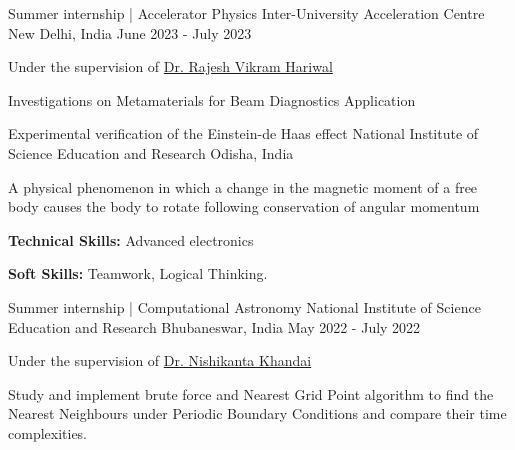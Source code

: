 

\begin{cventries}

	\cventry
	{Summer internship | Accelerator Physics} %
	{Inter-University Acceleration Centre} %
	{New Delhi, India} %
	{June 2023 - July 2023} %
	{
		\begin{cvitems} %
			\item{Under the supervision of \href{https://www.researchgate.net/profile/Dr-Hariwal}{Dr. Rajesh Vikram Hariwal}}
			\item Investigations on Metamaterials for Beam Diagnostics Application
		\end{cvitems}
	}

	\cventry
	{Experimental verification of the Einstein-de Haas effect } %
	{National Institute of Science Education and Research} %
	{Odisha, India} %
	{} %
	{
		\begin{cvitems} %
			\item{ A physical phenomenon in which a change in the magnetic moment of a free body causes the body to rotate following conservation of angular momentum}
			\item {\textbf{Technical Skills:} Advanced electronics}
			\item {\textbf{Soft Skills:} Teamwork, Logical Thinking.}
		\end{cvitems}
	}

  	\cventry
    {Summer internship | Computational Astronomy} %
    {National Institute of Science Education and Research} %
    {Bhubaneswar, India} %
    {May 2022 - July 2022} %
    {
      \begin{cvitems} %
      	\item{Under the supervision of \href{https://niser.irins.org/profile/241972}{Dr. Nishikanta Khandai}}
        \item Study and implement brute force and Nearest Grid Point algorithm to find the Nearest Neighbours under Periodic Boundary Conditions and compare their time complexities.
      \end{cvitems}
    }


\end{cventries}
